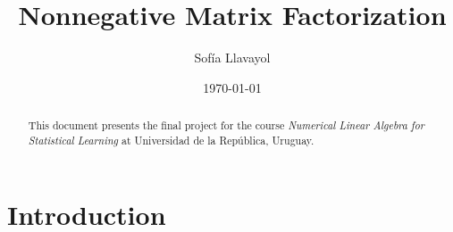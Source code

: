 \documentclass{amsart}
\title{Nonnegative Matrix Factorization}
\author{Sofía Llavayol}
\date{\today}
\begin{document}
\begin{abstract}
    This document presents the final project for the course {\it Numerical Linear Algebra for Statistical Learning} at Universidad de la República, Uruguay.
\end{abstract}

\maketitle

\section{Introduction}
\end{document}
